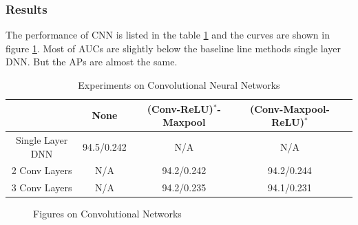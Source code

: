 \documentclass{article}
\begin{document}
			\subsubsection*{Results}
				The performance of CNN is listed in the table \ref{table:cnn-res} and the curves are shown in figure \ref{fig:cnn-proc}. Most of AUCs are slightly below the baseline line methods single layer DNN. But the APs are almost the same.
				\begin{table}[htbp]
					\centering
					\begin{tabular}{c|cccc}
						\hline
						\hline
						                  & None & (Conv-ReLU)$^\mathrm{*}$-Maxpool & (Conv-Maxpool-ReLU)$^\mathrm{*}$\\
						\hline
						Single Layer DNN & 94.5/0.242 & N/A & N/A \\
						2 Conv Layers    & N/A & 94.2/0.242 & 94.2/0.244 \\
						3 Conv Layers    & N/A & 94.2/0.235 & 94.1/0.231\\
						\hline
					\end{tabular}
					\caption{\label{table:cnn-res}Experiments on Convolutional Neural Networks}
				\end{table}
				\begin{figure}[H]
					\centering
					\caption{\label{fig:cnn-proc}Figures on Convolutional Networks}
				\end{figure}
\end{document}
